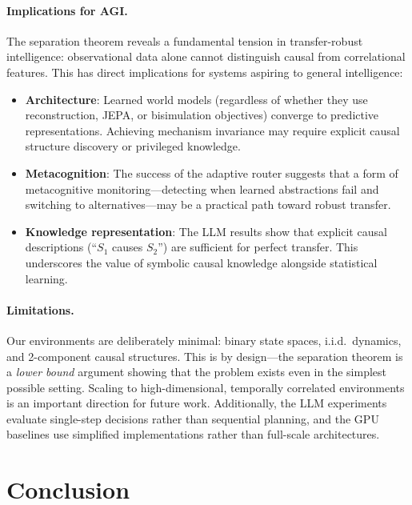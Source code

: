 \documentclass[runningheads]{llncs}
\begin{document}
\paragraph{Implications for AGI.} The separation theorem reveals a fundamental tension in transfer-robust intelligence: observational data alone cannot distinguish causal from correlational features. This has direct implications for systems aspiring to general intelligence:
\begin{itemize}
    \item \textbf{Architecture}: Learned world models (regardless of whether they use reconstruction, JEPA, or bisimulation objectives) converge to predictive representations. Achieving mechanism invariance may require explicit causal structure discovery or privileged knowledge.
    \item \textbf{Metacognition}: The success of the adaptive router suggests that a form of metacognitive monitoring---detecting when learned abstractions fail and switching to alternatives---may be a practical path toward robust transfer.
    \item \textbf{Knowledge representation}: The LLM results show that explicit causal descriptions (``$S_1$ causes $S_2$'') are sufficient for perfect transfer. This underscores the value of symbolic causal knowledge alongside statistical learning.
\end{itemize}

\paragraph{Limitations.} Our environments are deliberately minimal: binary state spaces, i.i.d.\ dynamics, and 2-component causal structures. This is by design---the separation theorem is a \emph{lower bound} argument showing that the problem exists even in the simplest possible setting. Scaling to high-dimensional, temporally correlated environments is an important direction for future work. Additionally, the LLM experiments evaluate single-step decisions rather than sequential planning, and the GPU baselines use simplified implementations rather than full-scale architectures.

\section{Conclusion}
\label{sec:conclusion}
\end{document}
